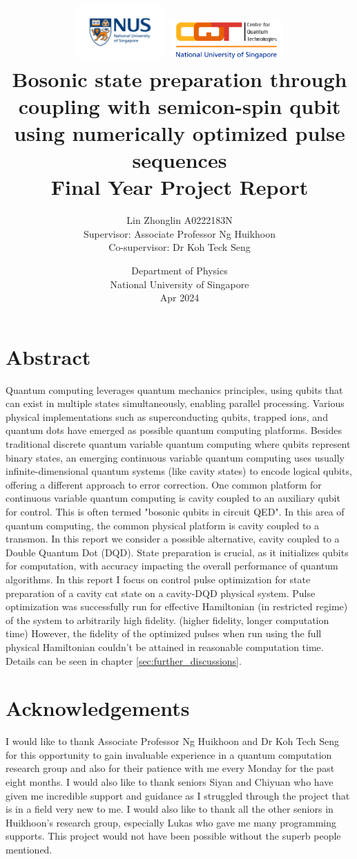\documentclass[12pt]{report}
\title{
\includegraphics[width=0.25\textwidth]{nus_logo.jpeg}
\includegraphics[width=0.32\textwidth]{cqt_logo.png}\\
{\LARGE \textbf{
    Bosonic state preparation through coupling with semicon-spin qubit using numerically optimized pulse sequences
    }}\\
\vspace{5mm}
{Final Year Project Report}
}
\author{
    {\normalsize Lin Zhonglin \hspace{10mm} A0222183N}\\
    \vspace{1mm}
    {\normalsize Supervisor: Associate Professor Ng Huikhoon}\\
    {\normalsize Co-supervisor: Dr Koh Teck Seng}
}
\date{
    {\normalsize Department of Physics}\\
    {\normalsize National University of Singapore}\\
    {\normalsize Apr 2024}
}
\begin{document}
\justifying
\linespread{1.2}
\setlength{\parskip}{1em}
\setlength{\parindent}{0pt}

\maketitle


\chapter*{Abstract}
Quantum computing leverages quantum mechanics principles, using qubits that can exist in multiple states simultaneously, enabling parallel processing. 
Various physical implementations such as superconducting qubits, trapped ions, and quantum dots have emerged as possible quantum computing platforms.
Besides traditional discrete quantum variable quantum computing where qubits represent binary states, an emerging continuous variable quantum computing uses usually infinite-dimensional quantum systems (like cavity states) to encode logical qubits, offering a different approach to error correction. \cite{RevModPhys.77.513}
One common platform for continuous variable quantum computing is cavity coupled to an auxiliary qubit for control.
This is often termed "bosonic qubits in circuit QED".\cite{Joshi_2021} In this area of quantum computing, the common physical platform is cavity coupled to a transmon. In this report we consider a possible alternative, cavity coupled to a Double Quantum Dot (DQD). \cite{D_Anjou_2019}
State preparation is crucial, as it initializes qubits for computation, with accuracy impacting the overall performance of quantum algorithms. \cite{Nielsen2010}
In this report I focus on control pulse optimization for state preparation of a cavity cat state on a cavity-DQD physical system. 
Pulse optimization was successfully run for effective Hamiltonian (in restricted regime) of the system to arbitrarily high fidelity. (higher fidelity, longer computation time)
However, the fidelity of the optimized pulses when run using the full physical Hamiltonian couldn't be attained in reasonable computation time. 
Details can be seen in chapter \ref{sec:further_discussions}.

\chapter*{Acknowledgements}
I would like to thank Associate Professor Ng Huikhoon and Dr Koh Tech Seng for this opportunity to gain invaluable experience in a quantum computation research group and also for their patience with me every Monday for the past eight months.
I would also like to thank seniors Siyan and Chiyuan who have given me incredible support and guidance as I struggled through the project that is in a field very new to me. 
I would also like to thank all the other seniors in Huikhoon's research group, especially Lukas who gave me many programming supports.
This project would not have been possible without the superb people mentioned.
\end{document}
